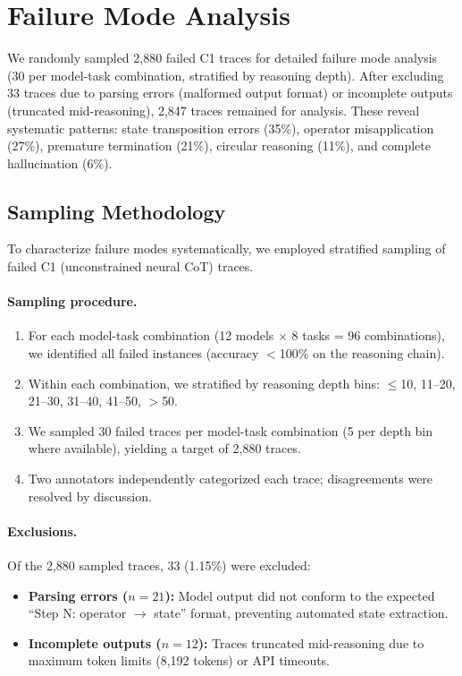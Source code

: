\documentclass{article}
\theoremstyle{plain}
\theoremstyle{definition}
\theoremstyle{remark}
\begin{document}
\section{Failure Mode Analysis}
\label{app:failure}

We randomly sampled 2,880 failed C1 traces for detailed failure mode analysis (30 per model-task combination, stratified by reasoning depth). After excluding 33 traces due to parsing errors (malformed output format) or incomplete outputs (truncated mid-reasoning), 2,847 traces remained for analysis. These reveal systematic patterns: state transposition errors (35\%), operator misapplication (27\%), premature termination (21\%), circular reasoning (11\%), and complete hallucination (6\%).

\subsection{Sampling Methodology}

To characterize failure modes systematically, we employed stratified sampling of failed C1 (unconstrained neural CoT) traces.

\paragraph{Sampling procedure.}
\begin{enumerate}[leftmargin=*,itemsep=1pt]
	\item For each model-task combination (12 models $\times$ 8 tasks = 96 combinations), we identified all failed instances (accuracy $<$100\% on the reasoning chain).
	\item Within each combination, we stratified by reasoning depth bins: $\leq$10, 11--20, 21--30, 31--40, 41--50, $>$50.
	\item We sampled 30 failed traces per model-task combination (5 per depth bin where available), yielding a target of 2,880 traces.
	\item Two annotators independently categorized each trace; disagreements were resolved by discussion.
\end{enumerate}

\paragraph{Exclusions.} Of the 2,880 sampled traces, 33 (1.15\%) were excluded:
\begin{itemize}[leftmargin=*,itemsep=1pt]
	\item \textbf{Parsing errors ($n=21$):} Model output did not conform to the expected ``Step N: operator $\rightarrow$ state'' format, preventing automated state extraction.
	\item \textbf{Incomplete outputs ($n=12$):} Traces truncated mid-reasoning due to maximum token limits (8,192 tokens) or API timeouts.
\end{itemize}
\end{document}
